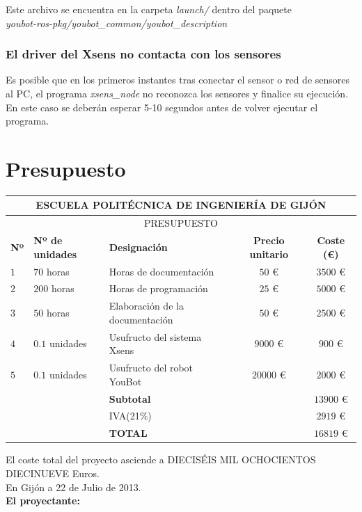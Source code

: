 \documentclass[12pt, a4paper]{report}
\begin{document}


Este archivo se encuentra en la carpeta \textit{launch/} dentro del paquete\\ 
\textit{youbot-ros-pkg/youbot\_common/youbot\_description}

\section{El driver del Xsens no contacta con los sensores}

Es posible que en los primeros instantes tras conectar el sensor o red de sensores al PC, el programa \textit{xsens\_node} no reconozca los sensores y finalice su ejecución. En este caso se deberán esperar 5-10 segundos antes de volver ejecutar el programa.

\part{Presupuesto}

\begin{table}[h]
\footnotesize
\center
\begin{tabular}{|l|l|l|c|c|}
\hline
\multicolumn{5}{|c|}{\textbf{ESCUELA POLITÉCNICA DE INGENIERÍA DE GIJÓN}}\\
\hline
\multicolumn{5}{|c|}{PRESUPUESTO}\\
\hline
\rule{0pt}{4ex}\textbf{Nº} & \textbf{Nº de unidades} & \textbf{Designación} & \textbf{Precio unitario} & \textbf{Coste (€)} \\ 
\hline
\rule{0pt}{4ex} $1$ & $70$ horas & Horas de documentación & $50$ € & $3500$ € \\
\rule{0pt}{4ex} $2$ & $200$ horas & Horas de programación & $25$ € & $5000$ € \\
\rule{0pt}{4ex} $3$ & $50$ horas & Elaboración de la documentación & $50$ € & $2500$ € \\
\rule{0pt}{4ex} $4$ & $0.1$ unidades & Usufructo del sistema Xsens & $9000$ € & $900$ € \\
\rule{0pt}{4ex} $5$ & $0.1$ unidades & Usufructo del robot YouBot & $20000$ € & $2000$ € \\
\hline
\rule{0pt}{4ex} & & \textbf{Subtotal} & & $13900$ € \\
\rule{0pt}{4ex} & & IVA(21\%) & & $2919$ €\\
\hline
\rule{0pt}{4ex} & & \textbf{TOTAL} & & $16819$ € \\
\hline
\end{tabular}	
\label{tab:presupuesto}	
\end{table}

\vspace{1cm}

El coste total del proyecto asciende a DIECISÉIS MIL OCHOCIENTOS\\ 
DIECINUEVE Euros.\\

En Gijón a 22 de Julio de 2013. \\

\textbf{El proyectante:}
\end{document}
